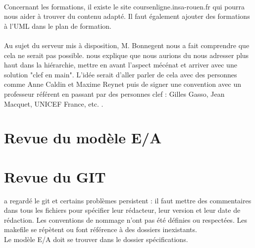 \documentclass [a4paper] {article}
\begin{document}
\paragraph{}
Concernant les formations, il existe le site coursenligne.insa-rouen.fr qui pourra nous aider à trouver du contenu adapté. Il faut également ajouter des formations à l'UML dans le plan de formation.
\paragraph{}
Au sujet du serveur mis à disposition, M. Bonnegent nous a fait comprendre que cela ne serait pas possible. \nomTuteurPedago{} nous explique que nous aurions du nous adresser plus haut dans la hiérarchie, mettre en avant l'aspect mécénat et arriver avec une solution "clef en main". L'idée serait d'aller parler de cela avec des personnes comme Anne Caldin et Maxime Reynet puis de signer une convention avec un professeur référent en passant par des personnes clef : Gilles Gasso, Jean Macquet, UNICEF France, etc. .


\section{Revue du modèle E/A}



\section{Revue du GIT}
\nomTuteurPedago{} a regardé le git et certains problèmes persistent : il faut mettre des commentaires dans tous les fichiers pour spécifier leur rédacteur, leur version et leur date de rédaction. Les conventions de nommage n'ont pas été définies ou respectées. Les makefile se répètent ou font référence à des dossiers inexistants.
\\
Le modèle E/A doit se trouver dans le dossier spécifications.




\newpage
\end{document}
